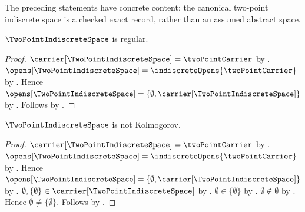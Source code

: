 The preceding statements have concrete content: the canonical two-point
indiscrete space is a checked exact record, rather than an assumed abstract
space.

\begin{proposition}\label{two_point_indiscrete_space_is_regular}
    $\TwoPointIndiscreteSpace$ is regular.
\end{proposition}
\begin{proof}
    $\carrier[\TwoPointIndiscreteSpace]=\twoPointCarrier$ by
        .
    $\opens[\TwoPointIndiscreteSpace]
        =\indiscreteOpens{\twoPointCarrier}$ by
        .
    Hence $\opens[\TwoPointIndiscreteSpace]
        =\{\emptyset,\carrier[\TwoPointIndiscreteSpace]\}$
        by .
    Follows by .
\end{proof}

\begin{proposition}\label{two_point_indiscrete_space_is_not_kolmogorov}
    $\TwoPointIndiscreteSpace$ is not Kolmogorov.
\end{proposition}
\begin{proof}
    $\carrier[\TwoPointIndiscreteSpace]=\twoPointCarrier$ by
        .
    $\opens[\TwoPointIndiscreteSpace]
        =\indiscreteOpens{\twoPointCarrier}$ by
        .
    Hence $\opens[\TwoPointIndiscreteSpace]
        =\{\emptyset,\carrier[\TwoPointIndiscreteSpace]\}$
        by .
    $\emptyset,\{\emptyset\}\in\carrier[\TwoPointIndiscreteSpace]$
        by .
    $\emptyset\in\{\emptyset\}$ by .
    $\emptyset\notin\emptyset$ by .
    Hence $\emptyset\neq\{\emptyset\}$.
    Follows by
        .
\end{proof}
